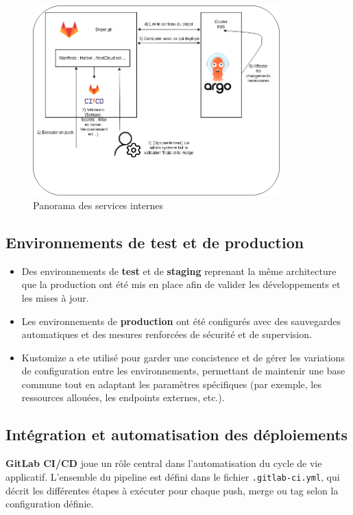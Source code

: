 \begin{figure}[H]
	\centering
	\includegraphics[width=0.85\textwidth]{figures/services-internes.png}
	\caption{Panorama des services internes}
\end{figure}

\subsection{Environnements de test et de production}

\begin{itemize}
	\item Des environnements de \textbf{test} et de \textbf{staging} reprenant la même architecture que la production ont été mis en place afin de valider les développements et les mises à jour.
	\item Les environnements de \textbf{production} ont été configurés avec des sauvegardes automatiques et des mesures renforcées de sécurité et de supervision.
	\item Kustomize a ete utilisé pour garder une concistence et de gérer les variations de configuration entre les environnements, permettant de maintenir une base commune tout en adaptant les paramètres spécifiques (par exemple, les ressources allouées, les endpoints externes, etc.).
\end{itemize}

\subsection{Intégration et automatisation des déploiements}

\textbf{GitLab CI/CD} joue un rôle central dans l'automatisation du cycle de vie applicatif. L’ensemble du pipeline est défini dans le fichier \texttt{.gitlab-ci.yml}, qui décrit les différentes étapes à exécuter pour chaque push, merge ou tag selon la configuration définie.

